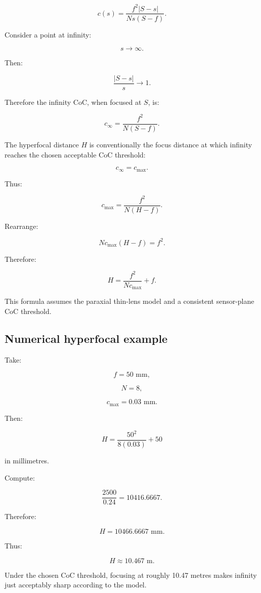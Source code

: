 \[ c(s)= \frac{f^2|S-s|}{Ns(S-f)}. \]

Consider a point at infinity:

\[ s\to\infty. \]

Then:

\[ \frac{|S-s|}{s}\to1. \]

Therefore the infinity CoC, when focused at \(S\), is:

\[ \boxed{ c_\infty= \frac{f^2}{N(S-f)}. } \]

The hyperfocal distance \(H\) is conventionally the focus distance at which infinity reaches the chosen acceptable CoC threshold:

\[ c_\infty=c_{\max}. \]

Thus:

\[ c_{\max} = \frac{f^2}{N(H-f)}. \]

Rearrange:

\[ N c_{\max}(H-f)=f^2. \]

Therefore:

\[ \boxed{ H=\frac{f^2}{N c_{\max}}+f. } \]

This formula assumes the paraxial thin-lens model and a consistent sensor-plane CoC threshold.

\subsection{Numerical hyperfocal example}\label{02-foundations-ii-ch036-numerical-hyperfocal-example}

\hypertarget{02-foundations-ii-ch036-numerical-hyperfocal-example}{}

Take:

\[ f=50\text{ mm}, \]

\[ N=8, \]

\[ c_{\max}=0.03\text{ mm}. \]

Then:

\[ H=\frac{50^2}{8(0.03)}+50 \]

in millimetres.

Compute:

\[ \frac{2500}{0.24}=10416.6667. \]

Therefore:

\[ H=10466.6667\text{ mm}. \]

Thus:

\[ \boxed{ H\approx10.467\text{ m}. } \]

Under the chosen CoC threshold, focusing at roughly 10.47 metres makes infinity just acceptably sharp according to the model.

